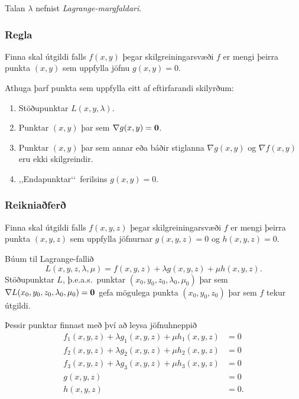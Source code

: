 Talan $\lambda$ nefnist \emph{Lagrange-margfaldari}.



\subsubsection{Regla  }
Finna skal útgildi falls $f(x,y)$ þegar skilgreiningarsvæði $f$ er mengi þeirra punkta $(x,y)$ sem uppfylla jöfnu $g(x,y)=0$.  

Athuga þarf punkta sem uppfylla eitt af eftirfarandi skilyrðum:

\begin {enumerate}
 \item Stöðupunktar $L(x,y,\lambda)$.
\item Punktar $(x,y)$ þar sem $\nabla g(x,y)=\mbox{${\bf 0}$}$.
\item  Punktar $(x,y)$ þar sem annar eða báðir stiglanna $\nabla
      g(x,y)$ og $\nabla f(x,y)$ eru ekki skilgreindir. 
\item ,,Endapunktar\lq\lq\ ferilsins $g(x,y)=0$.
 \end {enumerate}





\subsubsection{Reikniaðferð  }
Finna skal útgildi falls $f(x,y,z)$ þegar skilgreiningarsvæði $f$ er mengi þeirra punkta $(x,y,z)$ sem uppfylla jöfnurnar $g(x,y,z)=0$ og $h(x,y,z)=0$.  

Búum til Lagrange-fallið
$$L(x,y,z,\lambda,\mu)=f(x,y,z)+\lambda g(x,y,z)+\mu h(x,y,z).$$
Stöðupunktar $L$, þ.e.a.s.~punktar $(x_0,y_0,z_0,\lambda_0,\mu_0)$ þar sem $\nabla L(x_0,y_0,z_0,\lambda_0,\mu_0)=\mbox{${\bf 0}$}$ gefa mögulega punkta $(x_0,y_0,z_0)$ þar sem $f$ tekur útgildi.

Þessir punktar finnast með því að leysa jöfnuhneppið
\begin{align*}
f_1(x,y,z)+\lambda g_1(x,y,z)+\mu h_1(x,y,z)&=0\\
f_2(x,y,z)+\lambda g_2(x,y,z)+\mu h_2(x,y,z)&=0\\
f_3(x,y,z)+\lambda g_3(x,y,z)+\mu h_3(x,y,z)&=0\\
g(x,y,z)&=0\\
h(x,y,z)&=0.
\end{align*}








